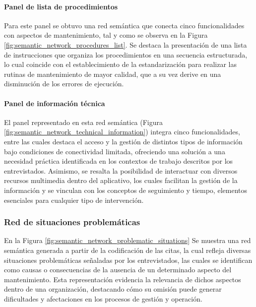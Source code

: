                 

            \paragraph{Panel de lista de procedimientos}
            
                Para este panel se obtuvo una red semántica que conecta cinco funcionalidades con aspectos de mantenimiento, tal y como se observa en la Figura \ref{fig:semantic_network_procedures_list}. Se destaca la presentación de una lista de instrucciones que organiza los procedimientos en una secuencia estructurada, lo cual coincide con el establecimiento de la estandarización para realizar las rutinas de mantenimiento de mayor calidad, que a su vez derive en  una disminución de los errores de ejecución. 

                

            \paragraph{Panel de información técnica}
            
                El panel representado en esta red semántica (Figura \ref{fig:semantic_network_technical_information}) integra cinco funcionalidades, entre las cuales destaca el acceso y la gestión de distintos tipos de información bajo condiciones de conectividad limitada, ofreciendo una solución a una necesidad práctica identificada en los contextos de trabajo descritos por los entrevistados. Asimismo, se resalta la posibilidad de interactuar con diversos recursos multimedia dentro del aplicativo, los cuales facilitan la gestión de la información y se vinculan con los conceptos de seguimiento y tiempo, elementos esenciales para cualquier tipo de intervención.

                

            \subsubsection{Red de situaciones problemáticas}

                En la Figura \ref{fig:semantic_network_problematic_situations} Se muestra una red semántica generada a partir de la codificación de las citas, la cual refleja diversas situaciones problemáticas señaladas por los entrevistados, las cuales se identifican como causas o consecuencias de la ausencia de un determinado aspecto del mantenimiento. Esta representación evidencia la relevancia de dichos aspectos dentro de una organización, destacando cómo su omisión puede generar dificultades y afectaciones en los procesos de gestión y operación.

